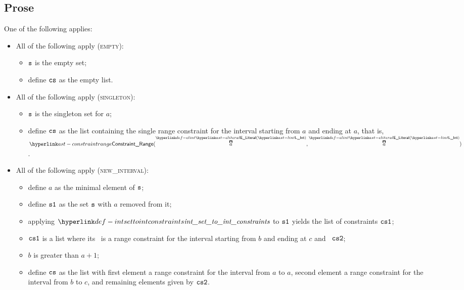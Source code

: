 \subsection{Prose}
One of the following applies:
\begin{itemize}
  \item All of the following apply (\textsc{empty}):
  \begin{itemize}
    \item $\texttt{s}$ is the empty set;
    \item define $\texttt{cs}$ as the empty list.
  \end{itemize}

  \item All of the following apply (\textsc{singleton}):
  \begin{itemize}
    \item $\texttt{s}$ is the singleton set for $a$;
    \item define $\texttt{cs}$ as the list containing the single range constraint for the interval starting from $a$
          and ending at $a$, that is, $\ConstraintRange(\ELInt{a}, \ELInt{a})$.
  \end{itemize}

  \item All of the following apply (\textsc{new\_interval}):
  \begin{itemize}
    \item define $a$ as the minimal element of $\texttt{s}$;
    \item define $\texttt{s1}$ as the set $\texttt{s}$ with $a$ removed from it;
    \item applying $\intsettointconstraints$ to $\texttt{s1}$ yields the list of constraints $\texttt{cs1}$;
    \item $\texttt{cs1}$ is a list where its \head\ is a range constraint for the interval starting from $b$ and ending at $c$
          and \tail\ $\texttt{cs2}$;
    \item $b$ is greater than $a+1$;
    \item define $\texttt{cs}$ as the list with first element a range constraint for the interval from $a$ to $a$,
          second element a range constraint for the interval from $b$ to $c$, and remaining elements given by $\texttt{cs2}$.
  \end{itemize}


\end{itemize}
